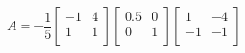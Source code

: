 \documentclass[titlepage]{article}
\begin{document}
\begin{equation}\label{eqn:diagonalization}
    A = -\frac{1}{5}
    \begin{bmatrix}
        -1 & 4\\
        1 & 1\\
    \end{bmatrix}
    \begin{bmatrix}
        0.5 & 0\\
        0 & 1\\
    \end{bmatrix}
    \begin{bmatrix}
        1 & -4\\
        -1 & -1\\
    \end{bmatrix}
\end{equation}
\end{document}
